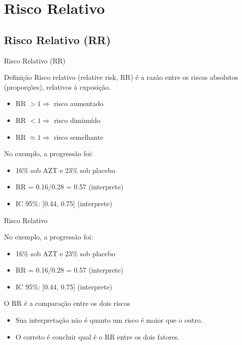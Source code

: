 \documentclass{beamer}
\begin{document}
\section{Risco Relativo}

\subsection{Risco Relativo (RR)}

\begin{frame}{Risco Relativo (RR)}
  \begin{block}{Definição}
    Risco relativo (relative risk, RR) é a razão entre os riscos absolutos (proporções), relativos à exposição.
  \end{block}
  \begin{itemize}
  \item RR $> 1 \Rightarrow$ risco aumentado
  \item RR $< 1 \Rightarrow$ risco diminuído
  \item RR $\approx 1 \Rightarrow$ risco semelhante
  \end{itemize}
  \begin{exampleblock}{No exemplo, a progressão foi:}
    \begin{itemize}
    \item 16\% sob AZT e 23\% sob placebo
    \item RR = 0.16/0.28 = 0.57 (interprete)
    \item<2-> IC 95\%: [0.44, 0.75] (interprete)
    \end{itemize}
  \end{exampleblock}
\end{frame}

\begin{frame}{Risco Relativo}
  \begin{exampleblock}{No exemplo, a progressão foi:}
    \begin{itemize}
    \item 16\% sob AZT e 23\% sob placebo
    \item RR = 0.16/0.28 = 0.57 (interprete)
    \item IC 95\%: [0.44, 0.75] (interprete)
    \end{itemize}
  \end{exampleblock}
  \begin{block}{O RR é a comparação entre os dois riscos}
    \small
    \begin{itemize}
    \item Sua interpretação \alert{não é} quanto um risco é maior que o outro.
    \item O correto é concluir qual é o RR \alert{entre} os dois fatores.
    \end{itemize}
  \end{block}
\end{frame}
\end{document}
